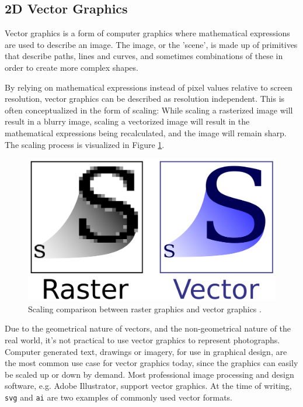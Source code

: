 \subsection{2D Vector Graphics}
Vector graphics is a form of computer graphics where mathematical expressions are used to describe an image.
The image, or the 'scene', is made up of primitives that describe paths, lines and curves, and sometimes combinations of these in order to create more complex shapes.

By relying on mathematical expressions instead of pixel values relative to screen resolution, vector graphics can be described as resolution independent.
This is often conceptualized in the form of scaling:
While scaling a rasterized image will result in a blurry image, scaling a vectorized image will result in the mathematical expressions being recalculated, and the image will remain sharp.
The scaling process is visualized in Figure \ref{fig:vectorscaling}.

\begin{figure}[h!]
\centering \includegraphics[width=0.5\linewidth]{images/bm_vs_svg.png}
\caption{Scaling comparison between raster graphics and vector graphics \cite{svg}.}
\label{fig:vectorscaling}
\end{figure}

Due to the geometrical nature of vectors, and the non-geometrical nature of the real world, it's not practical to use vector graphics to represent photographs.
Computer generated text, drawings or imagery, for use in graphical design, are the most common use case for vector graphics today, since the graphics can easily be scaled up or down by demand.
Most professional image processing and design software, e.g. Adobe Illustrator, support vector graphics.
At the time of writing, \texttt{svg} and \texttt{ai} are two examples of commonly used vector formats.


